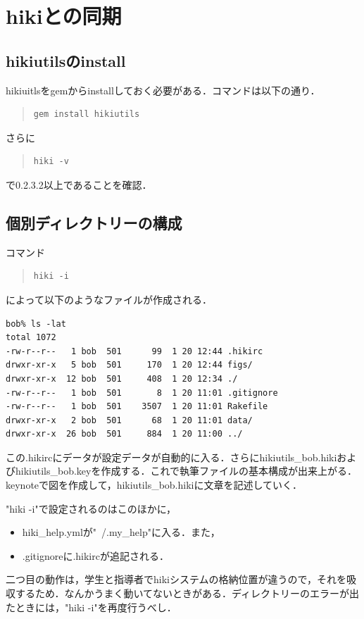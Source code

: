 \section{hikiとの同期}
\subsection{hikiutilsのinstall}
hikiuitlsをgemからinstallしておく必要がある．コマンドは以下の通り．
\begin{quote}\begin{verbatim}
gem install hikiutils
\end{verbatim}\end{quote}
さらに
\begin{quote}\begin{verbatim}
hiki -v
\end{verbatim}\end{quote}
で0.2.3.2以上であることを確認．

\subsection{個別ディレクトリーの構成}
コマンド
\begin{quote}\begin{verbatim}
hiki -i
\end{verbatim}\end{quote}
によって以下のようなファイルが作成される．
\begin{lstlisting}[style=customCsh,basicstyle={\scriptsize\ttfamily}]
bob% ls -lat
total 1072
-rw-r--r--   1 bob  501      99  1 20 12:44 .hikirc
drwxr-xr-x   5 bob  501     170  1 20 12:44 figs/
drwxr-xr-x  12 bob  501     408  1 20 12:34 ./
-rw-r--r--   1 bob  501       8  1 20 11:01 .gitignore
-rw-r--r--   1 bob  501    3507  1 20 11:01 Rakefile
drwxr-xr-x   2 bob  501      68  1 20 11:01 data/
drwxr-xr-x  26 bob  501     884  1 20 11:00 ../
\end{lstlisting}
この.hikircにデータが設定データが自動的に入る．さらにhikiutils\_bob.hikiおよびhikiutils\_bob.keyを作成する．これで執筆ファイルの基本構成が出来上がる．keynoteで図を作成して，hikiutils\_bob.hikiに文章を記述していく．

"hiki -i"で設定されるのはこのほかに，

\begin{itemize}
\item hiki\_help.ymlが"~/.my\_help"に入る．また，
\item .gitignoreに.hikircが追記される．
\end{itemize}
二つ目の動作は，学生と指導者でhikiシステムの格納位置が違うので，それを吸収するため．なんかうまく動いてないときがある．ディレクトリーのエラーが出たときには，"hiki -i"を再度行うべし．

